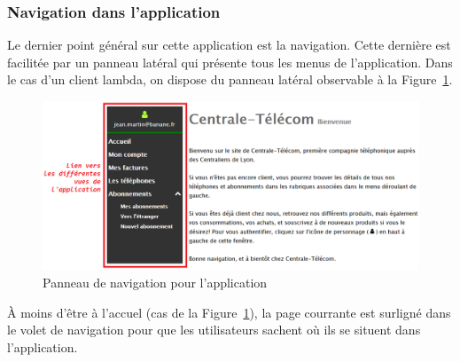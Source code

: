\subsubsection{Navigation dans l'application}
Le dernier point général sur cette application est la navigation. Cette dernière est facilitée par un panneau latéral qui présente tous les menus de l'application. Dans le cas d'un client \og lambda\fg{}, on dispose du panneau latéral observable à la Figure~\ref{fig:navigation}.

\begin{figure}[ht]
  \centering
  \includegraphics[width=.55\textwidth]{images/Plateforme/navigation}
  \caption{Panneau de navigation pour l'application}
  \label{fig:navigation}
\end{figure}

À moins d'être à l'accuel (cas de la Figure~\ref{fig:navigation}), la page courrante est surligné dans le volet de navigation pour que les utilisateurs sachent où ils se situent dans l'application.

